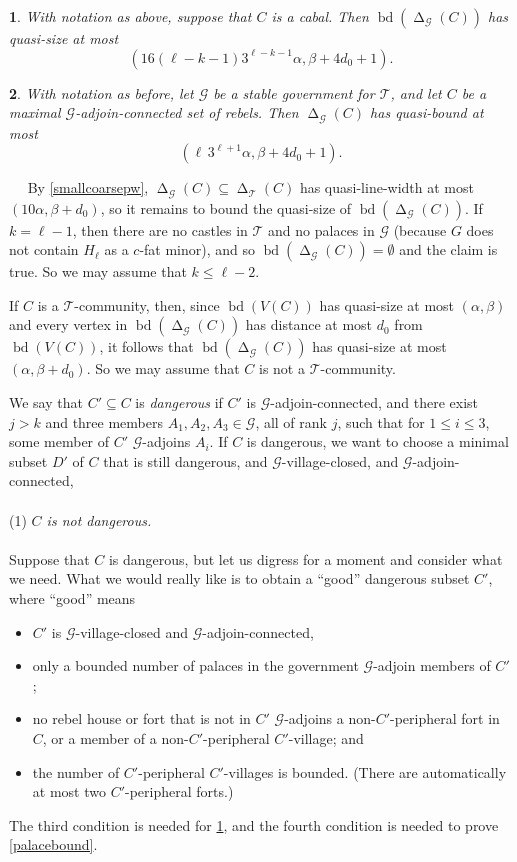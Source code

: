 \documentclass[10pt,a4paper]{amsart}
\theoremstyle{plain}
\newtheorem{thm}{}
\newcommand{\voro}{\operatorname{\Delta}}
\newcommand{\bd}{\operatorname{bd}}
\newcommand{\mac}{\mathcal}
\newcommand{\Proof}{\noindent{\bf Proof.}\ \ }
\newcommand{\Proof}{\noindent{\bf Proof.}\ \ }
\newcommand{\bd}{\operatorname{bd}}
\newcommand{\mac}{\mathcal}
\newcommand{\voro}{\operatorname{\Delta}}
\begin{document}
	\begin{thm}\label{cabalsaresmall}
		With notation as above, suppose that $C$ is a cabal.
		Then $\bd(\voro_{\mac G}(C))$ has quasi-size at most
		$$(16(\ell-k-1)3^{\ell-k-1}\alpha, \beta+4d_0+1).$$
	\end{thm}

	\begin{thm}\label{notmuchleft}
		With notation as before, 
		let $\mac G$ be a stable government for $\mac T$, and
		let $C$ be a maximal $\mac G$-adjoin-connected set of rebels. Then
		$\voro_{\mac G}(C)$ has quasi-bound at most 
		$$\left(\ell\,3^{\ell+1}\alpha, \beta+4d_0+1\right).$$
	\end{thm}

	\Proof
	By \ref{smallcoarsepw}, $\voro_{\mac G}(C)\subseteq \voro_{\mac T}(C)$ has quasi-line-width at most $(10\alpha,\beta+d_0)$, so it remains to bound the quasi-size of $\bd(\voro_{\mac G}(C))$. If $k=\ell-1$, then there are no castles in $\mac T$ and no palaces in $\mac G$ 
	(because $G$ does not contain $H_{\ell}$ as a $c$-fat minor), and so $\bd(\voro_{\mac G}(C))=\emptyset$
	and the claim is true. So we may assume that $k\le \ell-2$.
	
	If $C$ is a $\mac T$-community, then, since $\bd(V(C))$ has quasi-size at most $(\alpha,\beta)$ and every vertex in $\bd(\voro_{\mac G}(C))$ has distance at most
	$d_0$ from $\bd(V(C))$, it follows that $\bd(\voro_{\mac G}(C))$ has quasi-size at most $(\alpha,\beta+d_0)$.
	So we may assume that $C$ is not a $\mac T$-community.
	
	We say that $C'\subseteq C$ is {\em dangerous} if $C'$ is $\mac G$-adjoin-connected, and 
	there exist $j>k$ and three members $A_1,A_2,A_3\in \mac G$, all of rank $j$, such that for $1\le i\le 3$, some member of $C'$ $\mac G$-adjoins $A_i$.
	If $C$ is dangerous, we want to choose a minimal subset $D'$ of $C$ that is still dangerous, and $\mac G$-village-closed, and $\mac G$-adjoin-connected, 
	\\
	\\
	(1) {\em $C$ is not dangerous.}
	\\
	\\
	Suppose that $C$ is dangerous, but let us digress for a moment and consider what we need. What we would really like is to obtain 
	a ``good'' dangerous subset $C'$, where ``good'' means 
	\begin{itemize}
		\item $C'$ is $\mac G$-village-closed and  $\mac G$-adjoin-connected, 
		\item only a bounded number of palaces in the government $\mac G$-adjoin members of $C'$;
		\item no rebel house or fort that is not in $C'$ $\mac G$-adjoins a non-$C'$-peripheral fort in $C$, or a member of a non-$C'$-peripheral $C'$-village; and
		\item the number of $C'$-peripheral $C'$-villages is bounded. (There are automatically at most two $C'$-peripheral forts.)
	\end{itemize}
	The third condition is needed for \ref{cabalsaresmall}, and the fourth condition is needed to prove \ref{palacebound}.
	
\end{document}
